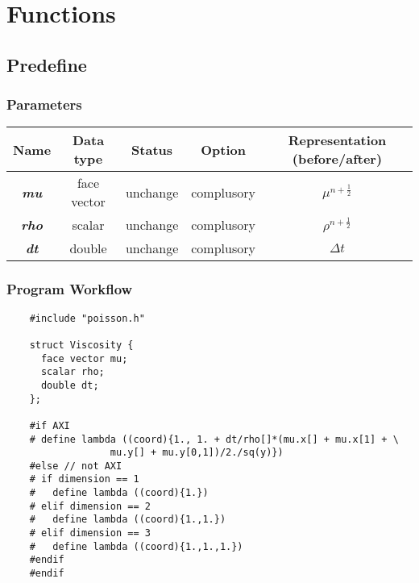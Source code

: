 \documentclass[a4paper]{article}
\newcommand{\para}[1]{\textbf{\emph{\textcolor{para}{#1}}}}
\begin{document}
\section{Functions}

\subsection{Predefine}

\subsubsection{Parameters}
\begin{center}
  \begin{tabular}{|c|c|c|c|c|}
    \hline
    Name & Data type & Status & Option & Representation (before/after)\\[0.5ex]
    \hline\hline
    \para{mu} & face vector & unchange & complusory & $\mu^{n+ \frac{1}{2}}$\\
    \hline
    \para{rho} & scalar & unchange & complusory & $ \rho^{n + \frac{1}{2}}$ \\
    \hline
    \para{dt} & double & unchange & complusory & $\Delta t$\\
    \hline
  \end{tabular}
\end{center}

\subsubsection{Program Workflow}
\begin{multicols}{2}
  \columnbreak
  \begin{verbatim}
    #include "poisson.h"

    struct Viscosity {
      face vector mu;
      scalar rho;
      double dt;
    };

    #if AXI
    # define lambda ((coord){1., 1. + dt/rho[]*(mu.x[] + mu.x[1] + \
                  mu.y[] + mu.y[0,1])/2./sq(y)})
    #else // not AXI
    # if dimension == 1
    #   define lambda ((coord){1.})
    # elif dimension == 2
    #   define lambda ((coord){1.,1.})
    # elif dimension == 3
    #   define lambda ((coord){1.,1.,1.})
    #endif
    #endif
  \end{verbatim}
\end{multicols}
\end{document}

